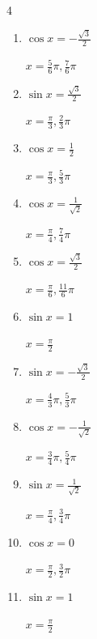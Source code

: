 \begin{multicols}{4}
\begin{enumerate}
  \item $\displaystyle \cos{x}  = -\frac{\sqrt{3}}{2}$

        $\displaystyle x = \frac{5}{6}\pi , \frac{7}{6}\pi$

  \item $\displaystyle \sin{x}  = \frac{\sqrt{3}}{2}$

        $\displaystyle x = \frac{\pi}{3} , \frac{2}{3}\pi$

  \item $\displaystyle \cos{x}  = \frac{1}{2}$

        $\displaystyle x = \frac{\pi}{3} , \frac{5}{3}\pi$

  \item $\displaystyle \cos{x}  = \frac{1}{\sqrt{2}}$

        $\displaystyle x = \frac{\pi}{4} , \frac{7}{4}\pi$

  \item $\displaystyle \cos{x}  = \frac{\sqrt{3}}{2}$

        $\displaystyle x = \frac{\pi}{6} , \frac{11}{6}\pi$

  \item $\displaystyle \sin{x}  = 1$

        $\displaystyle x = \frac{\pi}{2}$

  \item $\displaystyle \sin{x}  = -\frac{\sqrt{3}}{2}$

        $\displaystyle x = \frac{4}{3}\pi , \frac{5}{3}\pi$

  \item $\displaystyle \cos{x}  = -\frac{1}{\sqrt{2}}$

        $\displaystyle x = \frac{3}{4}\pi , \frac{5}{4}\pi$

  \item $\displaystyle \sin{x}  = \frac{1}{\sqrt{2}}$

        $\displaystyle x = \frac{\pi}{4} , \frac{3}{4}\pi$

  \item $\displaystyle \cos{x}  = 0$

        $\displaystyle x = \frac{\pi}{2} , \frac{3}{2}\pi$

  \item $\displaystyle \sin{x}  = 1$

        $\displaystyle x = \frac{\pi}{2}$

\columnbreak %

\resetques


\end{enumerate}
\end{multicols}
